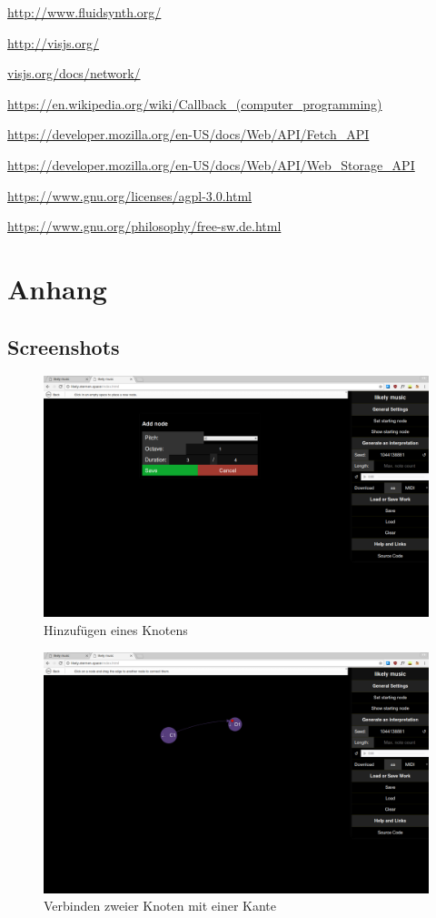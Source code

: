 \documentclass[a4paper,twocolumn]{article}
\begin{document}
\begin{thebibliography}{9}
  \url{http://www.fluidsynth.org/}

  \url{http://visjs.org/}

  \url{visjs.org/docs/network/}

  \url{https://en.wikipedia.org/wiki/Callback_(computer_programming)}

  \url{https://developer.mozilla.org/en-US/docs/Web/API/Fetch_API}

  \url{https://developer.mozilla.org/en-US/docs/Web/API/Web_Storage_API}

  \url{https://www.gnu.org/licenses/agpl-3.0.html}

  \url{https://www.gnu.org/philosophy/free-sw.de.html}
\end{thebibliography}

\clearpage
\onecolumn

\section*{Anhang}

\subsection*{Screenshots}
\begin{figure}[H]
  \begin{center}
  \includegraphics[width=.7\textwidth]{screenshots/add-node.png}
  \end{center}
  \caption{Hinzufügen eines Knotens}
\end{figure}

\begin{figure}[H]
  \begin{center}
  \includegraphics[width=.7\textwidth]{screenshots/add-edge-drag.png}
  \end{center}
  \caption{Verbinden zweier Knoten mit einer Kante}
\end{figure}
\end{document}
